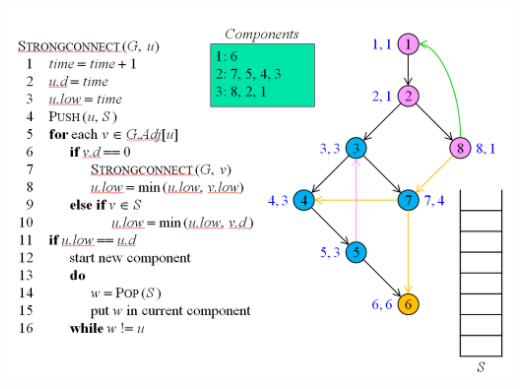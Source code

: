 \documentclass[a4paper, landscape, 8pt]{article}
\begin{document}
\includegraphics[]{StrongConnect} \clearpage
\end{document}
